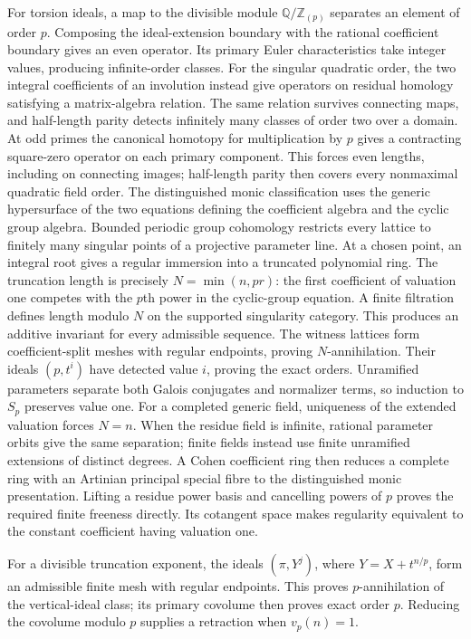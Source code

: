 \documentclass[11pt,a4paper]{article}
\theoremstyle{definition}\newtheorem{definition}[theorem]{Definition}
\theoremstyle{remark}\newtheorem{remark}[theorem]{Remark}
\newcommand{\Z}{\mathbb Z}\newcommand{\Q}{\mathbb Q}
\begin{document}
For torsion ideals, a map to the divisible module $\Q/\Z_{(p)}$
separates an element of order $p$.  Composing the ideal-extension
boundary with the rational coefficient boundary gives an even
operator.  Its primary Euler characteristics take integer values,
producing infinite-order classes.  For the singular quadratic order,
the two integral coefficients of an involution instead give operators
on residual homology satisfying a matrix-algebra relation.  The same
relation survives connecting maps, and half-length parity detects
infinitely many classes of order two over a domain.
At odd primes the canonical homotopy for multiplication by $p$ gives
a contracting square-zero operator on each primary component.  This
forces even lengths, including on connecting images; half-length parity
then covers every nonmaximal quadratic field order.
The distinguished monic classification uses the generic hypersurface
of the two equations defining the coefficient algebra and the cyclic
group algebra.  Bounded periodic group cohomology restricts every
lattice to finitely many singular points of a projective parameter
line.  At a chosen point, an integral root gives a regular immersion
into a truncated polynomial ring.  The truncation length is precisely
$N=\min(n,pr)$: the first coefficient of valuation one competes with
the $p$th power in the cyclic-group equation.  A finite filtration
defines length modulo $N$ on the supported singularity category.
This produces an additive invariant for every admissible sequence.
The witness lattices form coefficient-split meshes with regular
endpoints, proving $N$-annihilation.  Their ideals $(p,t^i)$ have
detected value $i$, proving the exact orders.  Unramified parameters
separate both Galois conjugates and normalizer terms, so induction
to $S_p$ preserves value one.  For a completed generic field,
uniqueness of the extended valuation forces $N=n$.
When the residue field is infinite, rational parameter orbits give
the same separation; finite fields instead use finite unramified
extensions of distinct degrees.  A Cohen coefficient ring then
reduces a complete ring with an Artinian principal special fibre
to the distinguished monic presentation.  Lifting a residue power
basis and cancelling powers of $p$ proves the required finite
freeness directly.  Its cotangent space makes regularity equivalent
to the constant coefficient having valuation one.

For a divisible truncation exponent, the ideals $(\pi,Y^j)$,
where $Y=X+t^{n/p}$, form an admissible finite mesh with regular
endpoints.  This proves $p$-annihilation of the vertical-ideal
class; its primary covolume then proves exact order $p$.
Reducing the covolume modulo $p$ supplies a retraction when
$v_p(n)=1$.
\end{document}

